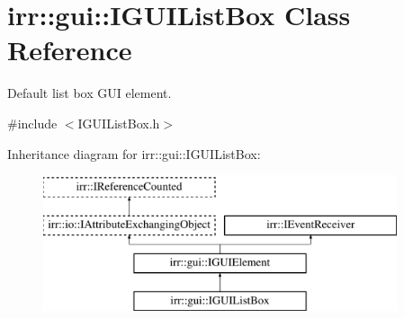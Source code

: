 \hypertarget{classirr_1_1gui_1_1IGUIListBox}{}\section{irr\+:\+:gui\+:\+:I\+G\+U\+I\+List\+Box Class Reference}
\label{classirr_1_1gui_1_1IGUIListBox}


Default list box G\+UI element.  




{\ttfamily \#include $<$I\+G\+U\+I\+List\+Box.\+h$>$}

Inheritance diagram for irr\+:\+:gui\+:\+:I\+G\+U\+I\+List\+Box\+:\begin{figure}[H]
\begin{center}
\leavevmode
\includegraphics[height=4.000000cm]{classirr_1_1gui_1_1IGUIListBox}
\end{center}
\end{figure}
